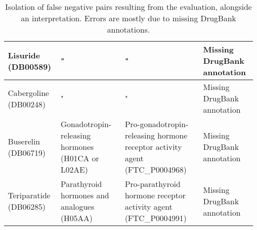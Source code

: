 \begin{table}[htbp]
\begin{tabular}{|p{2cm}|p{4cm}|p{4cm}|p{4cm}|}
Lisuride (DB00589) & " & " & Missing DrugBank annotation \\ \hline
Cabergoline (DB00248) & " & " & Missing DrugBank annotation \\ \hline
Buserelin (DB06719) & Gonadotropin-releasing hormones (H01CA or L02AE) & Pro-gonadotropin-releasing hormone receptor activity agent (FTC\_P0004968) & Missing DrugBank annotation \\ \hline
Teriparatide (DB06285) & Parathyroid hormones and analogues (H05AA) & Pro-parathyroid hormone receptor activity agent (FTC\_P0004991) & Missing DrugBank annotation \\ \hline
\end{tabular}
\caption{Isolation of false negative pairs resulting from the evaluation, alongside an interpretation. Errors are mostly due to missing DrugBank annotations.}
\label{table:falsenegatives}
\end{table}

